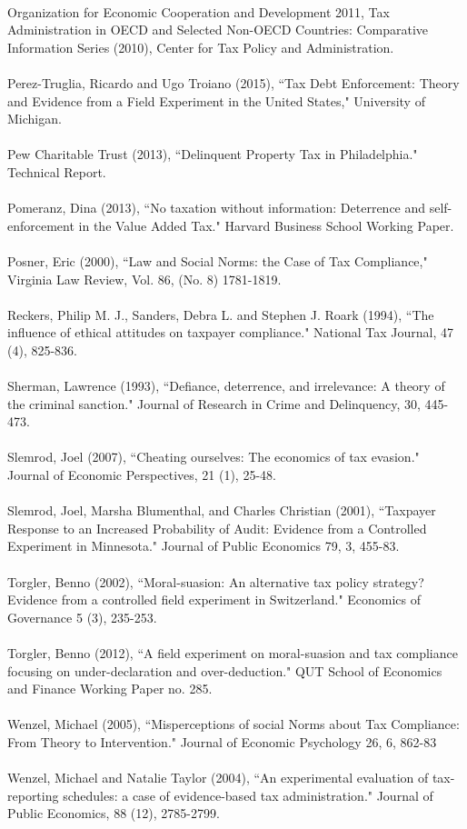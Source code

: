 \documentclass[12pt,titlepage]{article}
\begin{document}
\\
Organization for Economic Cooperation and Development 2011, Tax Administration in OECD and Selected Non-OECD Countries: Comparative Information Series (2010), Center for Tax Policy and Administration.  \\
\\
Perez-Truglia, Ricardo and Ugo Troiano (2015), ``Tax Debt Enforcement: Theory and Evidence from a Field Experiment in the United States," University of Michigan.  \\
\\
Pew Charitable Trust (2013), ``Delinquent Property Tax in Philadelphia." Technical Report. \\
\\
Pomeranz, Dina (2013), ``No taxation without information: Deterrence and self-enforcement in the Value
Added Tax." Harvard Business School Working Paper. \\
\\
Posner, Eric (2000), ``Law and Social Norms: the Case of Tax Compliance," Virginia Law Review, Vol. 86, (No. 8) 1781-1819. \\
\\
Reckers, Philip M. J., Sanders, Debra L. and Stephen J. Roark (1994), ``The influence of ethical attitudes on
taxpayer compliance." National Tax Journal, 47 (4), 825-836. \\
\\
Sherman, Lawrence (1993), ``Defiance, deterrence, and irrelevance: A theory of the criminal sanction."
Journal of Research in Crime and Delinquency, 30,  445-473. \\
\\ 
Slemrod, Joel (2007), ``Cheating ourselves: The economics of tax evasion." Journal of Economic
Perspectives, 21 (1), 25-48. \\
\\
Slemrod, Joel, Marsha Blumenthal, and Charles Christian (2001), ``Taxpayer Response to an Increased Probability of Audit: Evidence from a Controlled Experiment in Minnesota." Journal of Public Economics 79, 3, 455-83.\\
\\
Torgler, Benno (2002), ``Moral-suasion: An alternative tax policy strategy? Evidence from a controlled field
experiment in Switzerland." Economics of Governance 5 (3), 235-253. \\
\\
Torgler, Benno (2012),  ``A field experiment on moral-suasion and tax compliance focusing on under-declaration
and over-deduction." QUT School of Economics and Finance Working Paper no. 285. \\
\\
Wenzel, Michael (2005), ``Misperceptions of social Norms about Tax Compliance: From Theory to Intervention." Journal of Economic Psychology 26, 6, 862-83\\
\\
Wenzel, Michael and Natalie Taylor (2004),  ``An experimental evaluation of tax-reporting schedules: a case of
evidence-based tax administration." Journal of Public Economics, 88 (12), 2785-2799.
\end{document}
